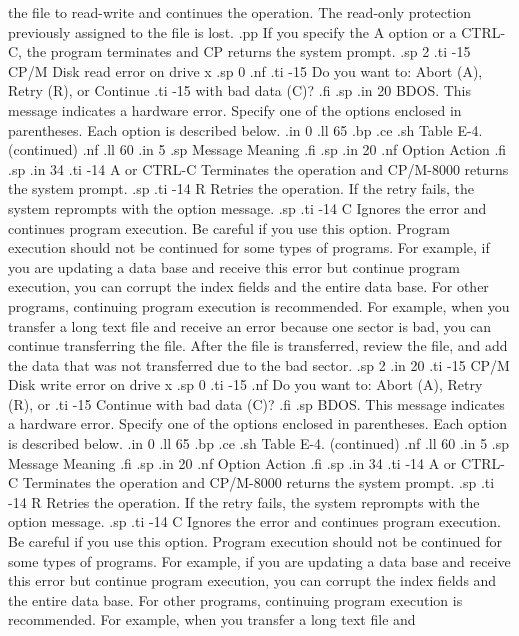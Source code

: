 the file to read-write and continues the operation.  The 
read-only protection previously assigned to the file is lost.
.pp
If you specify the A option or a CTRL-C, the program terminates 
and CP returns the system prompt.
.sp 2
.ti -15
CP/M Disk read error on drive x
.sp 0
.nf
.ti -15
Do you want to:  Abort (A), Retry (R), or Continue 
.ti -15
with bad data (C)?
.fi
.sp
.in 20
BDOS.  This message indicates a hardware error.  Specify one of the options 
enclosed in parentheses.  Each option is described below.
.in 0
.ll 65
.bp
.ce
.sh
Table E-4.  (continued)
.nf
.ll 60
.in 5
.sp
Message        Meaning
.fi
.sp
.in 20
.nf
Option        Action
.fi
.sp
.in 34  
.ti -14
A or CTRL-C   Terminates the operation and CP/M-8000 returns the 
system prompt.
.sp
.ti -14
R             Retries the operation.  If the retry fails, the 
system reprompts with the option message.
.sp
.ti -14
C             Ignores the error and continues program execution. 
Be careful if you use this option.  Program execution should 
not be continued for some types of programs.  For example, if 
you are updating a data base and receive this error but continue 
program execution, you can corrupt the index fields and the entire 
data base.  For other programs, continuing program execution is 
recommended.  For example, when you transfer a long text file and 
receive an error because one sector is bad, you can continue 
transferring the file.  After the file is transferred, review 
the file, and add the data that was not transferred due to the 
bad sector.
.sp 2
.in 20
.ti -15
CP/M Disk write error on drive x
.sp 0
.ti -15
.nf
Do you want to:  Abort (A), Retry (R), or 
.ti -15
Continue with bad data (C)?
.fi
.sp
BDOS.  This message indicates a hardware error.  Specify one of the options 
enclosed in parentheses.  Each option is described below.
.in 0
.ll 65
.bp
.ce
.sh
Table E-4.  (continued)
.nf
.ll 60
.in 5
.sp
Message        Meaning
.fi
.sp
.in 20
.nf
Option        Action
.fi
.sp
.in 34
.ti -14
A or CTRL-C   Terminates the operation and CP/M-8000 returns the 
system prompt.
.sp
.ti -14
R             Retries the operation.  If the retry fails, the 
system reprompts with the option message.
.sp
.ti -14
C             Ignores the error and continues program execution. 
Be careful if you use this option.  Program execution should 
not be continued for some types of programs.  For example, if 
you are updating a data base and receive this error but continue 
program execution, you can corrupt the index fields and the entire 
data base.  For other programs, continuing program execution is 
recommended.  For example, when you transfer a long text file and 
